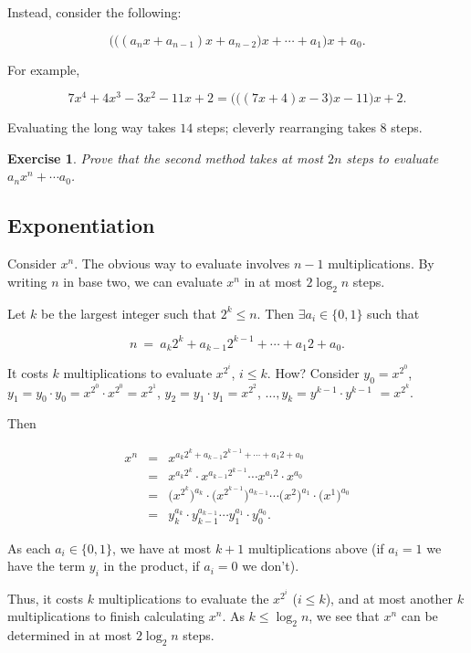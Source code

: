 \documentclass[12pt,letterpaper]{report}
\newcommand\be{\begin{equation}}
\newcommand\ee{\end{equation}}
\newcommand\bea{\begin{eqnarray}}
\newcommand\eea{\end{eqnarray}}
\newtheorem{exe}[thm]{Exercise}
\begin{document}
Instead, consider the following:

\be \Bigg( \Big((a_n x + a_{n-1})x + a_{n-2} \Big)x + \cdots +
a_1\Bigg)x + a_0. \ee

For example,

\be 7x^4 + 4x^3 - 3x^2 - 11x + 2 = \Bigg( \Big((7x + 4)x - 3\Big)x
- 11 \Bigg)x + 2. \ee

Evaluating the long way takes $14$ steps; cleverly rearranging
takes $8$ steps.

\begin{exe} Prove that the second method takes at most $2n$ steps to
evaluate $a_n x^n + \cdots a_0$.
\end{exe}

\subsection{Exponentiation}

Consider $x^n$. The obvious way to evaluate involves $n-1$
multiplications. By writing $n$ in base two, we can evaluate $x^n$
in at most $2 \log_2 n$ steps.

Let $k$ be the largest integer such that $2^k \le n$. Then
$\exists a_i \in \{0,1\}$ such that

\be n \ = \ a_k 2^k + a_{k-1} 2^{k-1} + \cdots + a_1 2 + a_0. \ee

It costs $k$ multiplications to evaluate $x^{2^i}$, $i \le k$.
How? Consider $y_0 = x^{2^0}$, $y_1 = y_0 \cdot y_0 = x^{2^0}
\cdot x^{2^0} = x^{2^1}$, $y_2 = y_1 \cdot y_1 = x^{2^2}$, $\dots,
y_k = y^{k-1} \cdot y^{k-1}$ $= x^{2^k}$.

Then

\bea x^n & = & x^{a_k 2^k + a_{k-1} 2^{k-1} + \cdots + a_1 2 +
a_0} \nonumber\\ & = & x^{a_k 2^k} \cdot x^{a_{k-1} 2^{k-1} }
\cdots x^{a_1 2} \cdot x^{a_0} \nonumber\\ & = & \Big( x^{2^k}
\Big)^{a_k} \cdot \Big( x^{2^{k-1}} \Big)^{a_{k-1}} \cdots \Big(
x^{2} \Big)^{a_1} \cdot \Big( x^{1} \Big)^{a_0} \nonumber\\ & = &
y_k^{a_k} \cdot y_{k-1}^{a_{k-1}} \cdots y_1^{a_1} \cdot
y_0^{a_0}. \eea

As each $a_i \in \{0, 1\}$, we have at most $k+1$ multiplications
above (if $a_i = 1$ we have the term $y_i$ in the product, if $a_i
= 0$ we don't).

Thus, it costs $k$ multiplications to evaluate the $x^{2^i}$ ($i
\le k$), and at most another $k$ multiplications to finish
calculating $x^n$. As $k \le \log_2 n$, we see that $x^n$ can be
determined in at most $2 \log_2 n$ steps.
\end{document}
